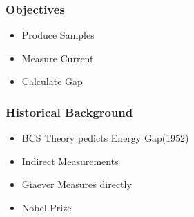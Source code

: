 \frame{\tableofcontents}
\frame
  {
  \frametitle{Objectives}

    \begin{itemize}
      \item<1-> Produce Samples
      \item<2-> Measure Current
      \item<3-> Calculate Gap
   \end{itemize}
   }
   \frame
     {
     \frametitle{Historical Background}
     
     \begin{itemize}
       \item<1-> BCS Theory pedicts Energy Gap(1952)
       \item<2-> Indirect Measurements
       \item<3-> Giaever Measures directly
       \item<4-> Nobel Prize
    \end{itemize}
    }
   

   

